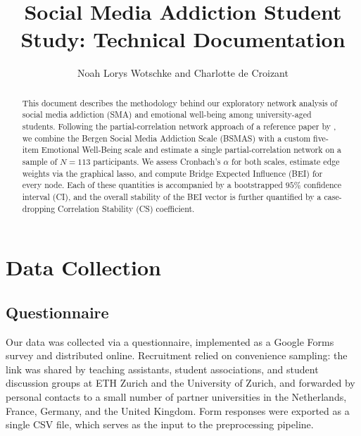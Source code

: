 \documentclass{article}
\title{Social Media Addiction Student Study: Technical Documentation}
\author{Noah Lorys Wotschke and Charlotte de Croizant}
\begin{document}
\maketitle

\begin{abstract}
This document describes the methodology behind our exploratory network
analysis of social media addiction (SMA) and emotional well-being among
university-aged students. Following the partial-correlation network
approach of a reference paper by \textcite{wang2025dark}, we combine the Bergen Social Media
Addiction Scale (BSMAS) with a custom five-item Emotional Well-Being scale
and estimate a single partial-correlation network on a sample of
$N = 113$ participants. We assess Cronbach's $\alpha$ for both scales,
estimate edge weights via the graphical lasso, and compute Bridge Expected
Influence (BEI) for every node. Each of these quantities is accompanied
by a bootstrapped $95\%$ confidence interval (CI), and the overall
stability of the BEI vector is further quantified by a case-dropping
Correlation Stability (CS) coefficient.
\end{abstract}

\section{Data Collection}

\subsection{Questionnaire}
Our data was collected via a questionnaire, implemented as a Google Forms
survey and distributed online. Recruitment relied on convenience sampling:
the link was shared by teaching assistants, student associations, and
student discussion groups at ETH Zurich and the University of Zurich, and
forwarded by personal contacts to a small number of partner universities
in the Netherlands, France, Germany, and the United Kingdom. Form
responses were exported as a single CSV file, which serves as the input
to the preprocessing pipeline.
\end{document}
